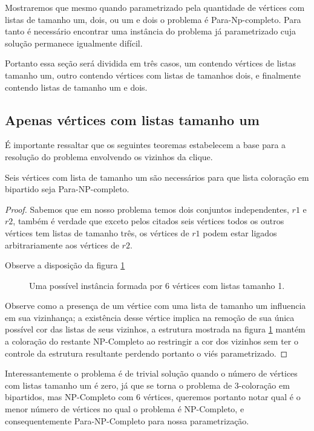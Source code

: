 Mostraremos que mesmo quando parametrizado pela quantidade de vértices com listas de tamanho um, dois, ou um e dois o problema é Para-Np-completo. Para tanto é necessário encontrar uma instância do problema já parametrizado cuja solução permanece igualmente difícil.

Portanto essa seção será dividida em três casos, um contendo vértices de listas tamanho um, outro contendo vértices com listas de tamanhos dois, e finalmente contendo listas de tamanho um e dois.
\subsection{Apenas vértices com listas tamanho um}
É importante ressaltar que os seguintes teoremas estabelecem a base para a resolução do problema envolvendo os vizinhos da clique. 
\begin{teorema}
 \label{teorema:6-v-np}
  Seis vértices com lista de tamanho um são necessários para que lista coloração em bipartido seja Para-NP-completo. 
\end{teorema}
\begin{proof}
 Sabemos que em nosso problema temos dois conjuntos independentes, $r1$ e $r2$, também é verdade que exceto pelos citados seis vértices todos os outros vértices tem listas de tamanho três, os vértices de $r1$ podem estar ligados arbitrariamente aos vértices de $r2$. 
 
 Observe a disposição da figura \ref{fig:seis-vertices-lista-um}
 
\begin{figure}[H]
		\centering
		
		\caption{Uma possível instância formada por 6 vértices com listas tamanho 1. }
		\label{fig:seis-vertices-lista-um}
\end{figure}

Observe como a presença de um vértice com uma lista de tamanho um influencia em sua vizinhança; a existência desse vértice implica na remoção de sua única possível cor das listas de seus vizinhos, a estrutura mostrada na figura \ref{fig:seis-vertices-lista-um} mantém a coloração do restante NP-Completo ao restringir a cor dos vizinhos sem ter o controle da estrutura resultante perdendo portanto o viés parametrizado.

\end{proof}

Interessantemente o problema é de trivial solução quando o número de vértices com listas tamanho um é zero, já que se torna o problema de 3-coloração em bipartidos, mas NP-Completo com 6 vértices, queremos portanto notar qual é o menor número de vértices no qual o problema é NP-Completo, e consequentemente Para-NP-Completo para nossa parametrização.


